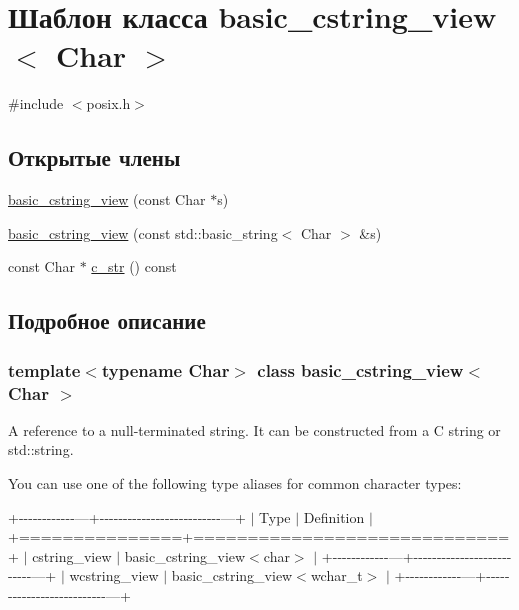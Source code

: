 \hypertarget{classbasic__cstring__view}{}\section{Шаблон класса basic\+\_\+cstring\+\_\+view$<$ Char $>$}
\label{classbasic__cstring__view}


{\ttfamily \#include $<$posix.\+h$>$}

\subsection*{Открытые члены}
\begin{DoxyCompactItemize}
\item 
\hyperlink{classbasic__cstring__view_ab464b2378652892cec4716d3e3d475c7}{basic\+\_\+cstring\+\_\+view} (const Char $\ast$s)
\item 
\hyperlink{classbasic__cstring__view_a10b92cc0e3e67789601984099b9ed339}{basic\+\_\+cstring\+\_\+view} (const std\+::basic\+\_\+string$<$ Char $>$ \&s)
\item 
const Char $\ast$ \hyperlink{classbasic__cstring__view_a19ace9be4e7617e5a978df29113279ee}{c\+\_\+str} () const
\end{DoxyCompactItemize}


\subsection{Подробное описание}
\subsubsection*{template$<$typename Char$>$\newline
class basic\+\_\+cstring\+\_\+view$<$ Char $>$}

A reference to a null-\/terminated string. It can be constructed from a C string or {\ttfamily std\+::string}.

You can use one of the following type aliases for common character types\+:

+-\/-\/-\/-\/-\/-\/-\/-\/-\/-\/-\/-\/---+-\/-\/-\/-\/-\/-\/-\/-\/-\/-\/-\/-\/-\/-\/-\/-\/-\/-\/-\/-\/-\/-\/-\/-\/-\/-\/---+ $\vert$ Type $\vert$ Definition $\vert$ +===============+=============================+ $\vert$ cstring\+\_\+view $\vert$ basic\+\_\+cstring\+\_\+view$<$char$>$ $\vert$ +-\/-\/-\/-\/-\/-\/-\/-\/-\/-\/-\/-\/---+-\/-\/-\/-\/-\/-\/-\/-\/-\/-\/-\/-\/-\/-\/-\/-\/-\/-\/-\/-\/-\/-\/-\/-\/-\/-\/---+ $\vert$ wcstring\+\_\+view $\vert$ basic\+\_\+cstring\+\_\+view$<$wchar\+\_\+t$>$ $\vert$ +-\/-\/-\/-\/-\/-\/-\/-\/-\/-\/-\/-\/---+-\/-\/-\/-\/-\/-\/-\/-\/-\/-\/-\/-\/-\/-\/-\/-\/-\/-\/-\/-\/-\/-\/-\/-\/-\/-\/---+

